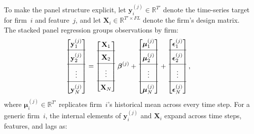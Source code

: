 \documentclass[pdflatex,sn-mathphys-num]{sn-jnl}%
\theoremstyle{thmstyleone}%
\theoremstyle{thmstyletwo}%
\theoremstyle{thmstylethree}%
\begin{document}
To make the panel structure explicit, let $\mathbf{y}_i^{(j)} \in \mathbb{R}^{T'}$ denote the time-series target for firm~$i$ and feature~$j$, and let $\mathbf{X}_i \in \mathbb{R}^{T' \times FL}$ denote the firm's design matrix. The stacked panel regression groups observations by firm:
\begin{equation} \label{eq:ridge_panel}
\begin{bmatrix}
\mathbf{y}_{1}^{(j)} \\[2pt]
\hline
\\[-8pt]
\mathbf{y}_{2}^{(j)} \\[2pt]
\hline
\\[-8pt]
\vdots \\[2pt]
\hline
\\[-8pt]
\mathbf{y}_{N}^{(j)}
\end{bmatrix}
=
\begin{bmatrix}
\mathbf{X}_{1} \\[2pt]
\hline
\\[-8pt]
\mathbf{X}_{2} \\[2pt]
\hline
\\[-8pt]
\vdots \\[2pt]
\hline
\\[-8pt]
\mathbf{X}_{N}
\end{bmatrix}
\boldsymbol{\beta}^{(j)}
+
\begin{bmatrix}
\boldsymbol{\mu}_{1}^{(j)} \\[2pt]
\hline
\\[-8pt]
\boldsymbol{\mu}_{2}^{(j)} \\[2pt]
\hline
\\[-8pt]
\vdots \\[2pt]
\hline
\\[-8pt]
\boldsymbol{\mu}_{N}^{(j)}
\end{bmatrix}
+
\begin{bmatrix}
\boldsymbol{\epsilon}_{1}^{(j)} \\[2pt]
\hline
\\[-8pt]
\boldsymbol{\epsilon}_{2}^{(j)} \\[2pt]
\hline
\\[-8pt]
\vdots \\[2pt]
\hline
\\[-8pt]
\boldsymbol{\epsilon}_{N}^{(j)}
\end{bmatrix},
\end{equation}
where $\boldsymbol{\mu}_i^{(j)} \in \mathbb{R}^{T'}$ replicates firm~$i$'s historical mean across every time step. For a generic firm~$i$, the internal elements of $\mathbf{y}_i^{(j)}$ and $\mathbf{X}_i$ expand across time steps, features, and lags as:
\end{document}
